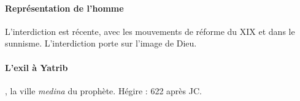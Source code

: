 \paragraph{Représentation de l'homme} L'interdiction est récente, avec les mouvements de réforme du XIX et dans le sunnisme. L'interdiction porte sur l'image de Dieu.

\paragraph{L'exil à Yatrib}, la ville \emph{medina} du prophète. Hégire : 622 après JC. 
